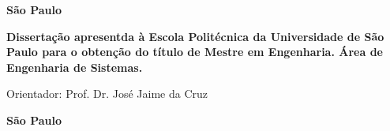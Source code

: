 \pagestyle{empty}

\begin{titlepage}


\begin{center}
{\LARGE \nomedoaluno}
\par
\vspace{200pt}
{\Huge \titulo}
\par
\vfill
\textbf{{\large São Paulo}\\
{\large \the\year}}
\end{center}
\end{titlepage}

\cleardoublepage

\pagestyle{fancy}



\thispagestyle{empty}

\begin{center}
{\LARGE \nomedoaluno}
\par
\vspace{200pt}
{\Huge \titulo}
\end{center}
\par
\vspace{90pt}
\hspace*{175pt}\parbox{7.6cm}{{\large  \textbf{Dissertação apresentda à Escola Politécnica da Universidade de São Paulo para o obtenção do título de Mestre em Engenharia. Área de Engenharia de Sistemas.}}}



\par
\vspace{1em}
\hspace*{175pt}\parbox{7.6cm}{{\large Orientador: Prof. Dr. José Jaime da Cruz}}

\par
\vfill
\begin{center}
\textbf{{\large São Paulo}\\
{\large \the\year}}
\end{center}

